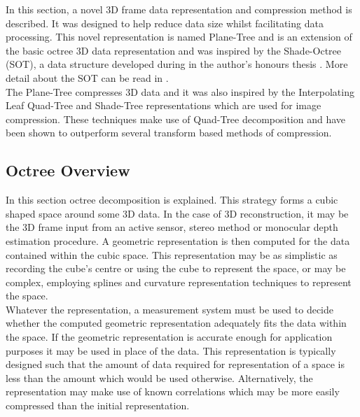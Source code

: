 In this section, a novel 3D frame data representation and compression method is described. It was designed to help reduce data size whilst facilitating data processing. This novel representation is named Plane-Tree and is an extension of the basic octree 3D data representation and was inspired by the Shade-Octree (SOT), a data structure developed during in the author's honours thesis \cite{Lincoln13Hons}. More detail about the SOT can be read in \cite{Lincoln13Hons}. \\

The Plane-Tree compresses 3D data and it was also inspired by the Interpolating Leaf Quad-Tree and Shade-Tree representations \cite{Lincoln13Interpolating,Gonzalez07ShadeTree} which are used for image compression. These techniques make use of Quad-Tree decomposition and have been shown to outperform several transform based methods of compression. 

\subsection{Octree Overview}

In this section octree decomposition is explained. This strategy forms a cubic shaped space around some 3D data. In the case of 3D reconstruction, it may be the 3D frame input from an active sensor, stereo method or monocular depth estimation procedure. A geometric representation is then computed for the data contained within the cubic space. This representation may be as simplistic as recording the cube's centre or using the cube to represent the space, or may be complex, employing splines and curvature representation techniques to represent the space. \\

Whatever the representation, a measurement system must be used to decide whether the computed geometric representation adequately fits the data within the space. If the geometric representation is accurate enough for application purposes it may be used in place of the data. This representation is typically designed such that the amount of data required for representation of a space is less than the amount which would be used otherwise. Alternatively, the representation may make use of known correlations which may be more easily compressed than the initial representation. \\


